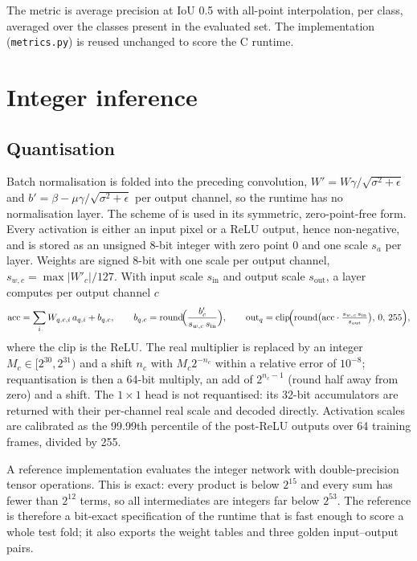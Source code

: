 \documentclass[11pt,a4paper]{article}
\begin{document}
The metric is average precision at IoU 0.5 with all-point interpolation, per
class, averaged over the classes present in the evaluated set. The
implementation (\texttt{metrics.py}) is reused unchanged to score the C
runtime.

\section{Integer inference}
\label{sec:runtime}

\subsection{Quantisation}

Batch normalisation is folded into the preceding convolution,
$W' = W\gamma/\sqrt{\sigma^2 + \epsilon}$ and $b' = \beta -
\mu\gamma/\sqrt{\sigma^2+\epsilon}$ per output channel, so the runtime has
no normalisation layer. The scheme of \cite{jacob2018} is used in its
symmetric, zero-point-free form. Every activation is either an input pixel
or a ReLU output, hence non-negative, and is stored as an unsigned 8-bit
integer with zero point 0 and one scale $s_a$ per layer. Weights are signed
8-bit with one scale per output channel, $s_{w,c} = \max|W'_c| / 127$. With
input scale $s_\text{in}$ and output scale $s_\text{out}$, a layer computes
per output channel $c$
\begin{equation}
  \mathrm{acc} = \sum_i W_{q,c,i}\, a_{q,i} + b_{q,c}, \qquad
  b_{q,c} = \operatorname{round}\!\Bigl(\frac{b'_c}{s_{w,c}\, s_\text{in}}\Bigr), \qquad
  \mathrm{out}_q = \operatorname{clip}\!\Bigl(\operatorname{round}\bigl(\mathrm{acc}\cdot \tfrac{s_{w,c}\, s_\text{in}}{s_\text{out}}\bigr),\, 0,\, 255\Bigr),
\end{equation}
where the clip is the ReLU. The real multiplier is replaced by an integer
$M_c \in [2^{30}, 2^{31})$ and a shift $n_c$ with $M_c 2^{-n_c}$ within a
relative error of $10^{-8}$; requantisation is then a 64-bit multiply, an add
of $2^{n_c-1}$ (round half away from zero) and a shift. The $1 \times 1$ head
is not requantised: its 32-bit accumulators are returned with their
per-channel real scale and decoded directly. Activation scales are
calibrated as the 99.99th percentile of the post-ReLU outputs over 64
training frames, divided by 255.

A reference implementation evaluates the integer network with
double-precision tensor operations. This is exact: every product is below
$2^{15}$ and every sum has fewer than $2^{12}$ terms, so all intermediates
are integers far below $2^{53}$. The reference is therefore a bit-exact
specification of the runtime that is fast enough to score a whole test fold;
it also exports the weight tables and three golden input--output pairs.
\end{document}
